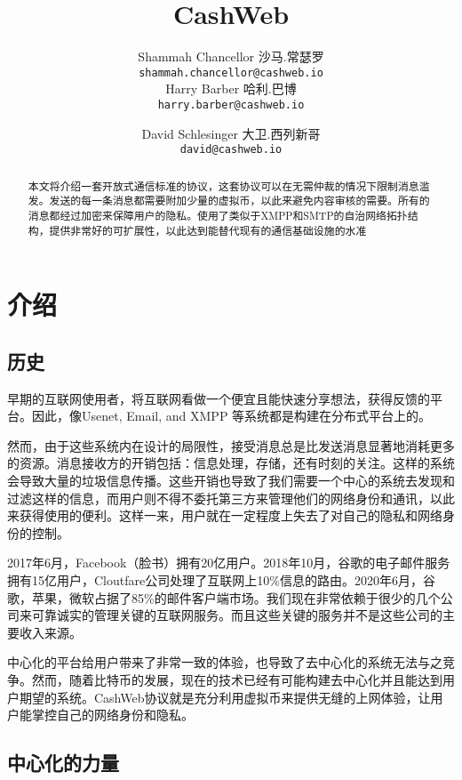 \documentclass{article}
\title{CashWeb}
\author{
  Shammah Chancellor 沙马.常瑟罗\\
  \texttt{shammah.chancellor@cashweb.io} \\
  \AND
  Harry Barber 哈利.巴博\\
  \texttt{harry.barber@cashweb.io} \\
  \and
  David Schlesinger 大卫.西列新哥\\
  \texttt{david@cashweb.io} \\
}
\begin{document}
\maketitle

\begin{abstract}
本文将介绍一套开放式通信标准的协议，这套协议可以在无需仲裁的情况下限制消息滥发。发送的每一条消息都需要附加少量的虚拟币，以此来避免内容审核的需要。所有的消息都经过加密来保障用户的隐私。使用了类似于XMPP和SMTP的自治网络拓扑结构，提供非常好的可扩展性，以此达到能替代现有的通信基础设施的水准
\end{abstract}

\section{介绍}

\subsection{历史}

早期的互联网使用者，将互联网看做一个便宜且能快速分享想法，获得反馈的平台。因此，像Usenet\supercite{rfc5536}\supercite{rfc5537}, Email\supercite{rfc5322}\supercite{rfc1939}\supercite{rfc5321}\supercite{rfc4551}, and XMPP\supercite{rfc3920}\supercite{rfc3921}\supercite{rfc3922}\supercite{rfc3923} 等系统都是构建在分布式平台上的。

然而，由于这些系统内在设计的局限性，接受消息总是比发送消息显著地消耗更多的资源。消息接收方的开销包括：信息处理，存储，还有时刻的关注。这样的系统会导致大量的垃圾信息传播。这些开销也导致了我们需要一个中心的系统去发现和过滤这样的信息，而用户则不得不委托第三方来管理他们的网络身份和通讯，以此来获得使用的便利。这样一来，用户就在一定程度上失去了对自己的隐私和网络身份的控制。

2017年6月，Facebook（脸书）拥有20亿用户。2018年10月，谷歌的电子邮件服务拥有15亿用户\supercite{gmail2018}，Cloutfare公司处理了互联网上10\%信息的路由\supercite{cloudflare2018}。2020年6月，谷歌，苹果，微软占据了85\%的邮件客户端市场\supercite{emailshare2020}。我们现在非常依赖于很少的几个公司来可靠诚实的管理关键的互联网服务。而且这些关键的服务并不是这些公司的主要收入来源。

中心化的平台给用户带来了非常一致的体验，也导致了去中心化的系统无法与之竞争。然而，随着比特币\supercite{nakamoto2008bpp}的发展，现在的技术已经有可能构建去中心化并且能达到用户期望的系统。CashWeb协议就是充分利用虚拟币来提供无缝的上网体验，让用户能掌控自己的网络身份和隐私。

\subsection{中心化的力量}
\end{document}
